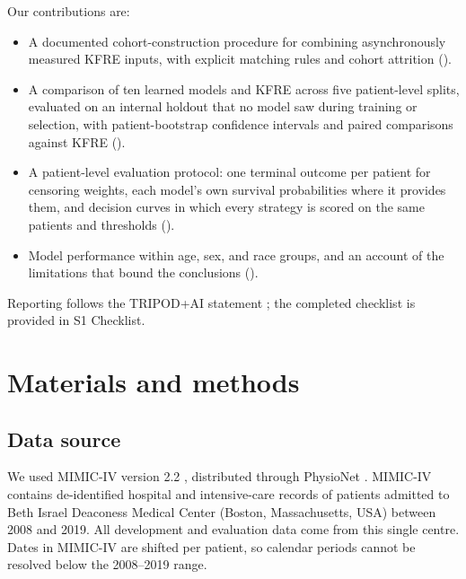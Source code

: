 \documentclass[10pt,letterpaper]{article}
\begin{document}
Our contributions are:
\begin{itemize}
    \item A documented cohort-construction procedure for combining asynchronously measured KFRE inputs, with explicit matching rules and cohort attrition ().
    \item A comparison of ten learned models and KFRE across five patient-level splits, evaluated on an internal holdout that no model saw during training or selection, with patient-bootstrap confidence intervals and paired comparisons against KFRE ().
    \item A patient-level evaluation protocol: one terminal outcome per patient for censoring weights, each model's own survival probabilities where it provides them, and decision curves in which every strategy is scored on the same patients and thresholds ().
    \item Model performance within age, sex, and race groups, and an account of the limitations that bound the conclusions ().
\end{itemize}
Reporting follows the TRIPOD+AI statement \cite{collins2024tripodai}; the completed checklist is provided in S1 Checklist.


\section*{Materials and methods}

\subsection*{Data source} \label{sec:data}
We used MIMIC-IV version 2.2 \cite{mimiciv_v22,johnson2023mimic_ehr}, distributed through PhysioNet \cite{goldberger2000physionet}. MIMIC-IV contains de-identified hospital and intensive-care records of patients admitted to Beth Israel Deaconess Medical Center (Boston, Massachusetts, USA) between 2008 and 2019. All development and evaluation data come from this single centre. Dates in MIMIC-IV are shifted per patient, so calendar periods cannot be resolved below the 2008--2019 range.
\end{document}
